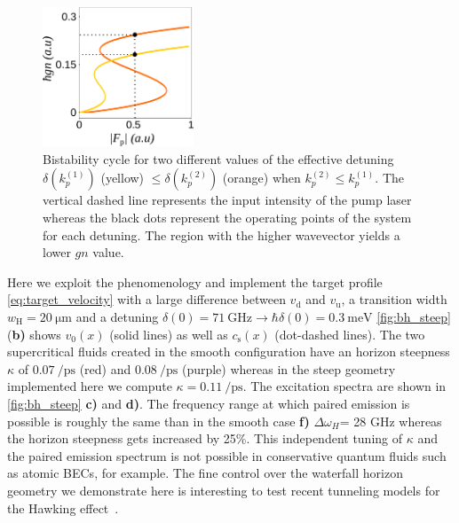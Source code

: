 \begin{figure}
    \centering
    \includegraphics[width=0.4\textwidth]{chap_custom_st/fig/bistab_to_gn.pdf}
    \caption{Bistability cycle for two different values of the effective detuning $\delta(k^{(1)}_p)$ (yellow) $\leq \delta(k^{(2)}_p) $ (orange) when $k^{(2)}_p \leq k^{(1)}_p $. The vertical dashed line
    represents the input intensity of the pump laser whereas the black dots represent the operating points of the system for each detuning. The region with the higher wavevector
    yields a lower $gn$ value.}
    \label{fig:bistab_steep}
\end{figure}

Here we exploit the phenomenology and implement the target profile \autoref{eq:target_velocity} with a large difference between $v_\mathrm{d}$ and $v_\mathrm{u}$, a transition width $w_\mathrm{H}=\SI{20}{\micro\meter}$ and a detuning $\delta(0)=\SI{71}{\giga\hertz} \rightarrow\hbar\delta(0)=\SI{0.3}{\milli \electronvolt}$
\autoref{fig:bh_steep} (\textbf{b)} shows $v_0(x)$ (solid lines) as well as $c_\mathrm{s}(x)$ (dot-dashed lines). The two supercritical fluids created in the smooth configuration 
have an horizon steepness $\kappa$ of $\SI{0.07}{\per \pico \second}$ (red) and $\SI{0.08}{\per \pico \second}$ (purple) whereas in the steep geometry implemented here we compute $\kappa = \SI{0.11}{\per \pico \second}$. The excitation spectra are shown in \autoref{fig:bh_steep} \textbf{c)} and \textbf{d)}.
The frequency range at which paired emission is possible is roughly the same than in the smooth case \textbf{f)} $\Delta \omega_H$= 28 GHz whereas the horizon steepness 
gets increased by 25\%. This independent tuning of $\kappa$ and the paired emission spectrum is not possible in conservative quantum fluids such as atomic BECs, for example.
The fine control over the waterfall horizon geometry we demonstrate here is interesting to test recent tunneling models for the Hawking effect~\cite{delporro2024tunneling}.


